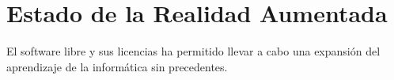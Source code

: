 \chapter{Estado de la Realidad Aumentada}

El software libre y sus licencias \cite{gplv3} ha permitido llevar a cabo una expansión del
aprendizaje de la informática sin precedentes.
